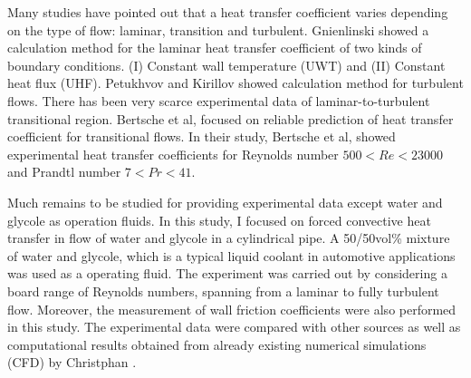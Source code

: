 \documentclass[conference]{IEEEtran}
\begin{document}
Many studies have pointed out that a heat transfer coefficient varies depending on the type of flow: laminar, transition and turbulent.
Gnienlinski\cite{Gnienlinski2010} showed a calculation method for the laminar heat transfer coefficient of two kinds of boundary conditions. (I) Constant wall temperature (UWT) and (I\hspace{-.1em}I) Constant heat flux (UHF).
Petukhvov and Kirillov\cite{Petukhov1958} showed calculation method for turbulent flows.
There has been very scarce experimental data of laminar-to-turbulent transitional region.
Bertsche et al,\cite{Bertsche2016} focused on reliable prediction of heat transfer coefficient for transitional flows.
In their study, Bertsche et al, showed experimental heat transfer coefficients for Reynolds number $500 < Re < 23000$ and Prandtl number $7 < Pr < 41$.

Much remains to be studied for providing experimental data except water and glycole as operation fluids.
In this study, I focused on forced convective heat transfer in flow of water and glycole in a cylindrical pipe.
A 50/50vol\% mixture of water and glycole, which is a typical liquid coolant in automotive applications was used as a operating fluid.
The experiment was carried out by considering a board range of Reynolds numbers, spanning from a laminar to fully turbulent flow.
Moreover, the measurement of wall friction coefficients were also performed in this study.
The experimental data were compared with other sources as well as computational results obtained from already existing numerical simulations (CFD) by Christphan \cite{Christphan2018}.



%
\end{document}
